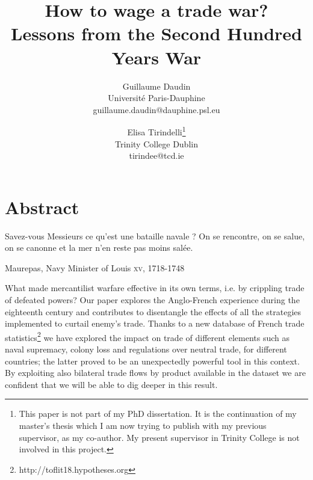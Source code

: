 \documentclass[12pt,a4paper,notitlepage]{article}
\begin{document}
\title{How to wage a trade war? \\
Lessons from the Second Hundred Years War}
\author{
  Guillaume Daudin \\ Université Paris-Dauphine \\guillaume.daudin@dauphine.psl.eu		
  \and
  Elisa Tirindelli\footnote{This paper is not part of my PhD dissertation. It is the continuation of my master's thesis which I am now trying to publish with my previous supervisor, as my co-author. My present supervisor in Trinity College is not involved in this project.} \\ Trinity College Dublin  \\ tirindee@tcd.ie
}
\maketitle

\section*{Abstract}

\epigraph{Savez-vous Messieurs ce qu’est une bataille navale ? On se rencontre, on se salue, on se canonne et la mer n’en reste pas moins salée.}{Maurepas, Navy Minister of Louis  \textsc{xv}, 1718-1748}


What made mercantilist warfare effective in its own terms, i.e. by crippling trade of defeated powers?
Our paper explores the Anglo-French experience during the eighteenth century and contributes to disentangle the effects of all the strategies implemented to curtail enemy's trade. Thanks to a new database of French trade statistics\footnote{http://toflit18.hypotheses.org} we have explored the impact on trade of different elements such as naval supremacy, colony loss and regulations over neutral trade, for different countries; the latter proved to be an unexpectedly powerful tool in this context. By exploiting also bilateral trade flows by product available in the dataset we are confident that we will be able to dig deeper in this result.   \\
\end{document}

